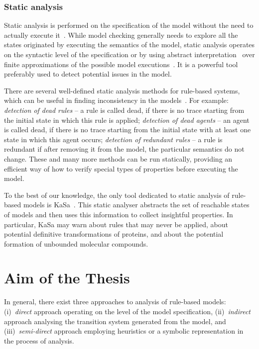 \documentclass[11pt,a4paper]{report}
\begin{document}
\subsection{Static analysis}\label{static_analysis}

Static analysis is performed on the specification of the model without the need to actually execute it~\cite{nielson2015principles}. While model checking generally needs to explore all the states originated by executing the semantics of the model, static analysis operates on the syntactic level of the specification or by using abstract interpretation~\cite{cousot1977abstract} over finite approximations of the possible model executions~\cite{pauleve2012static}. It is a powerful tool preferably used to detect potential issues in the model.

There are several well-defined static analysis methods for rule-based systems, which can be useful in finding inconsistency in the models~\cite{danos2009rule}. For example: \emph{detection of dead rules} -- a rule is called dead, if there is no trace starting from the initial state in which this rule is applied; \emph{detection of dead agents} -- an agent is called dead, if there is no trace starting from the initial state with at least one state in which this agent occurs; \emph{detection of redundant rules} -- a rule is redundant if after removing it from the model, the particular semantics do not change. These and many more methods can be run statically, providing an efficient way of how to verify special types of properties before executing the model.

To the best of our knowledge, the only tool dedicated to static analysis of rule-based models is KaSa~\cite{boutillier2018kasa}. This static analyser abstracts the set of reachable states of models and then uses this information to collect insightful properties. In particular, KaSa may warn about rules that may never be applied, about potential definitive transformations of proteins, and about the potential formation of unbounded molecular compounds.

\chapter{Aim of the Thesis} \label{chap:aim}

In general, there exist three approaches to analysis of rule-based models: (i)~\emph{direct} approach operating on the level of the model specification, (ii)~\emph{indirect} approach analysing the transition system generated from the model, and (iii)~\emph{semi-direct} approach employing heuristics or a symbolic representation in the process of analysis.
\end{document}
